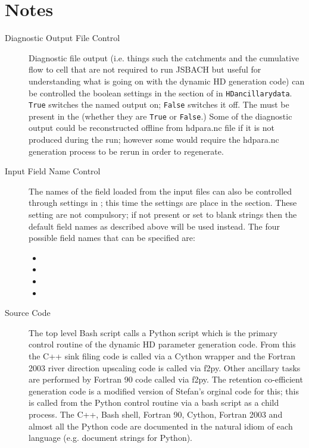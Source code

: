 \documentclass{article}
\begin{document}
\section{Notes} \label{section-notes}
\begin{description}
\item[Diagnostic Output File Control] Diagnostic file output (i.e. things such the catchments and the cumulative flow to cell that are not required to run JSBACH but useful for understanding what is going on with the dynamic HD generation code)  can be controlled the boolean settings in the  section of  in \texttt{HDancillarydata}. \texttt{True} switches the named output on; \texttt{False} switches it off. The   must be present in the  (whether they are \texttt{True} or \texttt{False}.) Some of the diagnostic output could be reconstructed offline from hdpara.nc file if it is not produced during the run; however some would require the hdpara.nc generation process to be rerun in order to regenerate.
\item[Input Field Name Control] The names of the field loaded from the input files can also be controlled through settings in ; this time the settings are place in the  section. These setting are not compulsory; if not present or set to blank strings then the default field names as described above will be used instead. The four possible field names that can be specified are: 
\begin{itemize}
\item {}
\item {}
\item {}
\item {}
\end{itemize}
\item[Source Code] The top level Bash script calls a Python script which is the primary control routine of the dynamic HD parameter generation code. From this the C++ sink filing code is called via a Cython wrapper and the Fortran 2003 river direction upscaling code is called via f2py. Other ancillary tasks are performed by Fortran 90 code called via f2py. The retention co-efficient generation code is a modified version of Stefan's orginal code for this; this is called from the Python control routine via a bash script as a child process. The C++, Bash shell, Fortran 90, Cython, Fortran 2003 and almost all the Python code are documented in the natural idiom of each language (e.g. document strings for Python).

\end{description}
\end{document}
